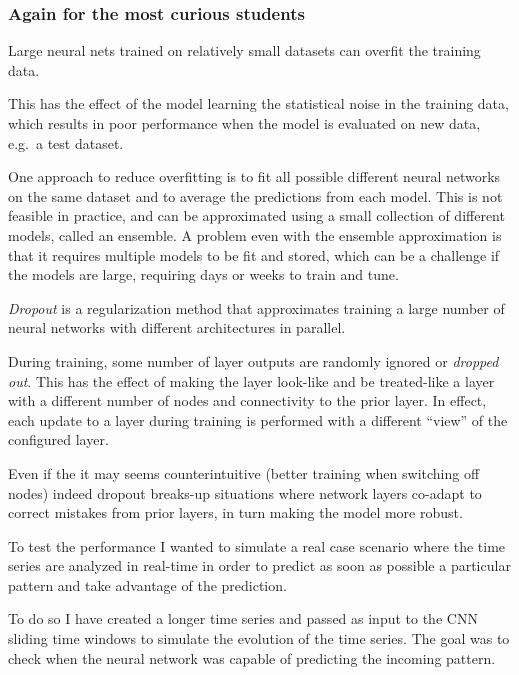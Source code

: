 \subsubsection{Again for the most curious
students}\label{again-for-the-most-curious-students}

Large neural nets trained on relatively small datasets can overfit the
training data.

This has the effect of the model learning the statistical noise in the
training data, which results in poor performance when the model is
evaluated on new data, e.g.~a test dataset.

One approach to reduce overfitting is to fit all possible different
neural networks on the same dataset and to average the predictions from
each model. This is not feasible in practice, and can be approximated
using a small collection of different models, called an ensemble. A
problem even with the ensemble approximation is that it requires
multiple models to be fit and stored, which can be a challenge if the
models are large, requiring days or weeks to train and tune.

\emph{Dropout} is a regularization method that approximates training a
large number of neural networks with different architectures in
parallel.

During training, some number of layer outputs are randomly ignored or
\emph{dropped out}. This has the effect of making the layer look-like
and be treated-like a layer with a different number of nodes and
connectivity to the prior layer. In effect, each update to a layer
during training is performed with a different ``view'' of the configured
layer.

Even if the it may seems counterintuitive (better training when
switching off nodes) indeed dropout breaks-up situations where network
layers co-adapt to correct mistakes from prior layers, in turn making
the model more robust.

To test the performance I wanted to simulate a real case scenario where
the time series are analyzed in real-time in order to predict as soon as
possible a particular pattern and take advantage of the prediction.

To do so I have created a longer time series and passed as input to the
CNN sliding time windows to simulate the evolution of the time series.
The goal was to check when the neural network was capable of predicting
the incoming pattern.

